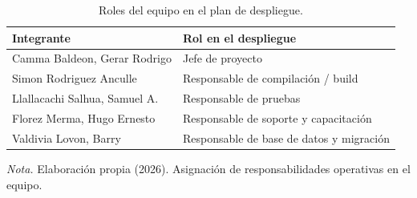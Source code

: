 \begin{table}[H]
  \centering
  \singlespacing
  \small
  \caption{Roles del equipo en el plan de despliegue.}
  \label{tab:despliegue_roles}
  \begin{tabularx}{\linewidth}{|>{\raggedright\arraybackslash}p{5.5cm}|>{\raggedright\arraybackslash}X|}
    \hline
    \textbf{Integrante} & \textbf{Rol en el despliegue} \\ \hline
    Camma Baldeon, Gerar Rodrigo & Jefe de proyecto \\ \hline
    Simon Rodriguez Anculle & Responsable de compilación / build \\ \hline
    Llallacachi Salhua, Samuel A. & Responsable de pruebas \\ \hline
    Florez Merma, Hugo Ernesto & Responsable de soporte y capacitación \\ \hline
    Valdivia Lovon, Barry & Responsable de base de datos y migración \\ \hline
  \end{tabularx}
  \par\vspace{0.2cm}
  {\raggedright \small \emph{Nota.} Elaboración propia (2026). Asignación de responsabilidades operativas en el equipo.\par}
\end{table}

